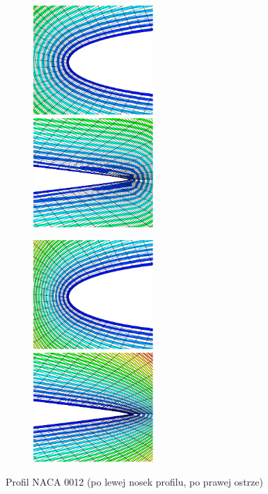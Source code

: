 \begin{figure}[h]	
    \begin{subfigure}[h]{\textwidth}
    	\includegraphics[width=0.5\textwidth]{Rysunki/NACA_0012_nosek_brute}  
    	\quad      
    	\includegraphics[width=0.5\textwidth]{Rysunki/NACA_0012_ostrze_brute}
    	\vspace{1cm}
	\end{subfigure}
	    
	\begin{subfigure}[h]{\textwidth}
    	\includegraphics[width=0.5\textwidth]{Rysunki/NACA_0012_nosek_poisson}  
    	\quad      
    	\includegraphics[width=0.5\textwidth]{Rysunki/NACA_0012_ostrze_poisson}		
	\end{subfigure}
	\caption{Profil NACA 0012 (po lewej nosek profilu, po prawej ostrze)}
\end{figure}

